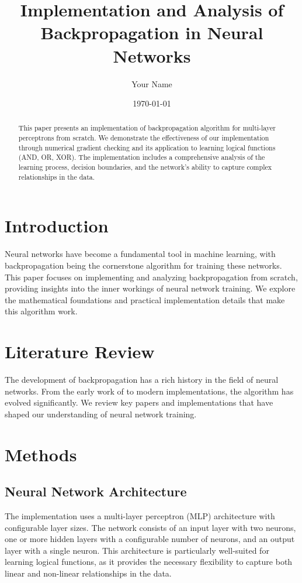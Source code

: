 \documentclass[11pt,a4paper]{article}
\title{Implementation and Analysis of Backpropagation in Neural Networks}
\author{Your Name}
\date{\today}
\begin{document}
\maketitle

\begin{abstract}
This paper presents an implementation of backpropagation algorithm for multi-layer perceptrons from scratch. We demonstrate the effectiveness of our implementation through numerical gradient checking and its application to learning logical functions (AND, OR, XOR). The implementation includes a comprehensive analysis of the learning process, decision boundaries, and the network's ability to capture complex relationships in the data.
\end{abstract}

\section{Introduction}
\label{sec:introduction}
Neural networks have become a fundamental tool in machine learning, with backpropagation being the cornerstone algorithm for training these networks. This paper focuses on implementing and analyzing backpropagation from scratch, providing insights into the inner workings of neural network training. We explore the mathematical foundations and practical implementation details that make this algorithm work.

\section{Literature Review}
\label{sec:literature}
The development of backpropagation has a rich history in the field of neural networks. From the early work of \cite{rumelhart1986learning} to modern implementations, the algorithm has evolved significantly. We review key papers and implementations that have shaped our understanding of neural network training.

\section{Methods}
\label{sec:methods}
\subsection{Neural Network Architecture}
The implementation uses a multi-layer perceptron (MLP) architecture with configurable layer sizes. The network consists of an input layer with two neurons, one or more hidden layers with a configurable number of neurons, and an output layer with a single neuron. This architecture is particularly well-suited for learning logical functions, as it provides the necessary flexibility to capture both linear and non-linear relationships in the data.
\end{document}
